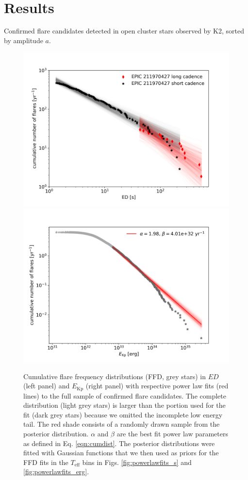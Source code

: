 \documentclass{aa}
\begin{document}
\section{Results}
\label{sec:results}
\begin{table}
\caption{Confirmed flare candidates detected in open cluster stars observed by K2, sorted by amplitude $a$.}
\label{tab:flares}
\centering
\footnotesize

\end{table}

\begin{figure}[ht!]
    \centering
    \includegraphics[width=0.49\hsize]{pics/FFDs/full_sample_ffd_ED_wheatland.png}
    \hspace{.01cm}
    \includegraphics[width=0.49\hsize]{pics/FFDs/full_sample_ffd_energy_wheatland.png}
    \caption{Cumulative flare frequency distributions (FFD, grey stars) in $ED$ (left panel) and $E_\mathrm{Kp}$ (right panel) with respective power law fits (red lines) to the full sample of confirmed flare candidates. The complete distribution (light grey stars) is larger than the portion used for the fit (dark grey stars) because we omitted the incomplete low energy tail. The red shade consists of a randomly drawn sample from the posterior distribution. $\alpha$ and $\beta$ are the best fit power law parameters as defined in Eq. \ref{eqn:cumdist}. The posterior distributions were fitted with Gaussian functions that we then used as priors for the FFD fits in the $T_\mathrm{eff}$ bins in Figs. \ref{fig:powerlawfits_s} and \ref{fig:powerlawfits_erg}.}
    \label{fig:powerlawfit_full}
\end{figure}
\end{document}
